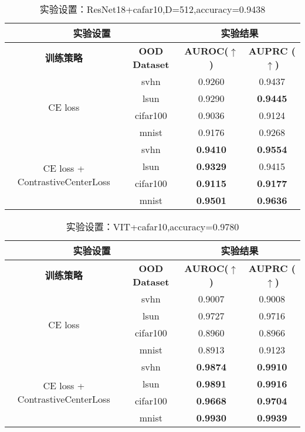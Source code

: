 \documentclass{article}
\begin{document}
\begin{table}[H]
	\captionsetup{labelformat=empty}
	\centering
	\renewcommand{\arraystretch}{1.2} %
	\setlength{\tabcolsep}{8pt} %
	\begin{tabular}{|c|c|c|c|}
		\hline
		\multicolumn{2}{|c|}{\textbf{实验设置}} & \multicolumn{2}{c|}{\textbf{实验结果}} \\ 
		\hline
		\textbf{训练策略} & \textbf{OOD Dataset} & \textbf{ AUROC($\uparrow$)} & \textbf{ AUPRC ($\uparrow$)} \\ 
		\hline
		\multirow{4}{*}{CE loss} 
		&	svhn & 0.9260 & 0.9437 \\
		&	lsun &   0.9290 &\textbf{0.9445} \\
		&	cifar100 & 0.9036 & 0.9124 \\
		&	mnist   & 0.9176 & 0.9268 \\
		\hline
		\multirow{4}{*}{CE loss + ContrastiveCenterLoss}
		&	svhn&\textbf{0.9410} & \textbf{ 0.9554}\\
		&	lsun & \textbf{0.9329} & 0.9415 \\
		&	cifar100&  \textbf{0.9115} &\textbf{ 0.9177}\\
		&	mnist  &  \textbf{0.9501} & \textbf{0.9636}\\
		\hline
	\end{tabular}
	\caption{实验设置：ResNet18+cafar10,D=512,accuracy=0.9438}
\end{table}


\begin{table}[H]
	\captionsetup{labelformat=empty}
	\centering
	\renewcommand{\arraystretch}{1.2} %
	\setlength{\tabcolsep}{8pt} %
	\begin{tabular}{|c|c|c|c|}
		\hline
		\multicolumn{2}{|c|}{\textbf{实验设置}} & \multicolumn{2}{c|}{\textbf{实验结果}} \\ 
		\hline
		\textbf{训练策略} & \textbf{OOD Dataset} & \textbf{ AUROC($\uparrow$)} & \textbf{ AUPRC ($\uparrow$)} \\ 
		\hline
		\multirow{4}{*}{CE loss} 
		&	svhn & 0.9007 & 0.9008 \\
		&	lsun &   0.9727 & 0.9716 \\
		&	cifar100 & 0.8960 & 0.8966 \\
		&	mnist   & 0.8913 & 0.9123 \\
		\hline
		\multirow{4}{*}{CE loss + ContrastiveCenterLoss}
		&	svhn&\textbf{0.9874} & \textbf{ 0.9910}\\
		&	lsun & \textbf{0.9891} & \textbf{0.9916} \\
		&	cifar100&  \textbf{0.9668} &\textbf{ 0.9704}\\
		&	mnist  &  \textbf{0.9930} & \textbf{0.9939}\\
		\hline
	\end{tabular}
	\caption{实验设置：VIT+cafar10,accuracy=0.9780}
\end{table}
\end{document}
